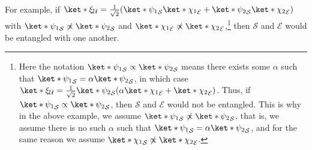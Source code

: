 \documentclass[12pt]{report}
\providecommand{\DIFaddbegin}{} %
\providecommand{\DIFaddend}{} %
\providecommand{\DIFdelbegin}{} %
\providecommand{\DIFdelend}{} %
\begin{document}
       For example, if $\ket*{\xi}_\mathcal{U}=\frac{1}{\sqrt{2}}(\ket*{\psi_1}_\mathcal{S}\ket*{\chi_1}_\mathcal{E}+\ket*{\psi_2}_\mathcal{S}\ket*{\chi_2}_\mathcal{E})$ with $\ket*{\psi_1}_\mathcal{S}\not\propto\ket*{\psi_2}_\mathcal{S}$ and $\ket*{\chi_1}_\mathcal{E}\not\propto\ket*{\chi_2}_\mathcal{E}$,\footnote{Here the notation $\ket*{\psi_1}_\mathcal{S}\propto\ket*{\psi_2}_\mathcal{S}$ means there exists some $\alpha$ such that $\ket*{\psi_1}_\mathcal{S}=\alpha\ket*{\psi_2}_\mathcal{S}$, in which case $\ket*{\xi}_\mathcal{U}=\frac{1}{\sqrt{2}}\ket*{\psi_2}_\mathcal{S}(\alpha\ket*{\chi_1}_\mathcal{E}+\ket*{\chi_2}_\mathcal{E})$. Thus, if  $\ket*{\psi_1}_\mathcal{S}\propto\ket*{\psi_2}_\mathcal{S}$, then  $\mathcal{S}$ and $\mathcal{E}$   %
\DIFdelbegin %
\DIFdelend \DIFaddbegin {}\DIFaddend %
       would not be entangled. This is why in the above example, we assume $\ket*{\psi_1}_\mathcal{S}\not\propto\ket*{\psi_2}_\mathcal{S}$, that is, we assume there is no such $\alpha$ such that $\ket*{\psi_1}_\mathcal{S}=\alpha\ket*{\psi_2}_\mathcal{S}$, and for the same reason we assume $\ket*{\chi_1}_\mathcal{S}\not\propto\ket*{\chi_2}_\mathcal{E}$.} then $\mathcal{S}$ and $\mathcal{E}$ would be entangled with one another.
\end{document}

